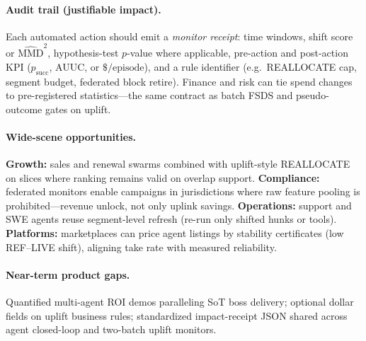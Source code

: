 \paragraph{Audit trail (justifiable impact).}
Each automated action should emit a \emph{monitor receipt}: time windows, shift score or $\widehat{\mathrm{MMD}}^2$, hypothesis-test $p$-value where applicable, pre-action and post-action KPI ($p_{\mathrm{succ}}$, AUUC, or $\$/\mathrm{episode}$), and a rule identifier (e.g.\ REALLOCATE cap, segment budget, federated block retire).
Finance and risk can tie spend changes to pre-registered statistics---the same contract as batch FSDS and pseudo-outcome gates on uplift.

\paragraph{Wide-scene opportunities.}
\textbf{Growth:} sales and renewal swarms combined with uplift-style REALLOCATE on slices where ranking remains valid on overlap support.
\textbf{Compliance:} federated monitors enable campaigns in jurisdictions where raw feature pooling is prohibited---revenue unlock, not only uplink savings.
\textbf{Operations:} support and SWE agents reuse segment-level refresh (re-run only shifted hunks or tools).
\textbf{Platforms:} marketplaces can price agent listings by stability certificates (low REF--LIVE shift), aligning take rate with measured reliability.

\paragraph{Near-term product gaps.}
Quantified multi-agent ROI demos paralleling SoT boss delivery; optional dollar fields on uplift business rules; standardized impact-receipt JSON shared across agent closed-loop and two-batch uplift monitors.
